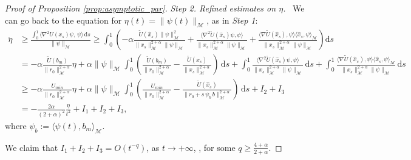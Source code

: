 \documentclass[10pt,a4paper]{amsart}
\newcommand{\ud}{\mathrm{d}}
\begin{document}
\begin{proof}[Proof of Proposition \ref{prop:asymptotic_par}]
\smallskip
\emph{Step 2. Refined estimates on $\eta$.} \ We can go back to the equation for $\eta(t)=\|\psi(t)\|_{\mathcal M}$, as in \textit{Step 1}:
\[
\begin{aligned}
\ddot \eta &\ge \frac{ \int_0^1 \langle \nabla^2 U(x_s)\psi, \, \psi \rangle \, \ud s}{\|\psi\|_\mathcal{M}} \ge \int_0^1 \left(-\alpha\frac{\tilde U(\hat x_s)\|\psi\|_\mathcal{M}^2}{\|x_s\|_\mathcal{M}^{2+\alpha}\|\psi\|_\mathcal{M}} + \frac{\langle\nabla^2 \tilde U(\hat x_s)\psi, \psi\rangle}{\|x_s\|_\mathcal{M}^{2+\alpha}\|\psi\|_\mathcal{M}} + \frac{\langle \nabla\tilde U(\hat x_s), \psi\rangle \langle \hat x_s, \psi\rangle_\mathcal{M}}{\|x_s\|_{\mathcal M}^{2+\alpha}\|\psi\|_\mathcal{M}}\right) \ud s
\\
&=-\alpha\frac{\tilde U(b_m)}{\|r_0\|_\mathcal{M}^{2+\alpha}} \eta + \alpha\|\psi\|_\mathcal{M}\int_0^1 \left(\frac{\tilde U(b_m)}{\|r_0\|_\mathcal{M}^{2+\alpha}} -\frac{\tilde U(\hat x_s)}{\|x_s\|_\mathcal{M}^{2+\alpha}}\right)\,\ud s + \int_0^1 \frac{\langle\nabla^2 \tilde U(\hat x_s)\psi, \psi\rangle}{\|x_s\|_\mathcal{M}^{2+\alpha}\|\psi\|_\mathcal{M}}\,\ud s +\int_0^1 \frac{\langle \nabla\tilde U(\hat x_s), \psi\rangle \langle \hat x_s, \psi\rangle_\mathcal{M}}{\|x_s\|_\mathcal{M}^{2+\alpha}\|\psi\|_\mathcal{M}}\, \ud s
\\
&{\ge -\alpha\frac{U_{min}}{\|r_0\|_\mathcal{M}^{2+\alpha}} \eta + \alpha\|\psi\|_\mathcal{M}\int_0^1 \left(\frac{U_{min}}{\|r_0\|_\mathcal{M}^{2+\alpha}} -\frac{\tilde U(\hat x_s)}{\|r_0+s\,\psi_b\,b\|_\mathcal{M}^{2+\alpha}}\right)\,\ud s + I_2+I_3}
\\
&=-\frac{2\alpha}{(2+\alpha)^2} \frac{\eta}{t^2} + I_1+I_2+I_3,
\end{aligned}
\]
where $\psi_b:=\langle \psi(t),b_m\rangle_{\mathcal M}$.

We claim that $I_1+I_2+I_3=O(t^{-q})$, as $t \rightarrow+\infty$, , for some $q \ge \frac{4+\alpha}{2+\alpha}$.


\end{proof}
\end{document}
